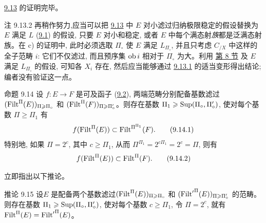 \hyperref[I.prop9.13]{9.13} 的证明完毕。

\begin{enonce*}[remark]{注 9.13.2}
再稍作努力,\pageoriginale 应当可以把 \hyperref[I.prop9.13]{9.13} 中 $E$ 对小滤过归纳极限稳定的假设替换为 $E$ 满足 $L$ (\hyperref[I.def9.1]{9.1}) 的假设, 只要 $E$ 对小和稳定, 或者 $E$ 中每个满态射\emph{族}都是泛满态射族。在 c) 的证明中, 此时必须选取 $\Pi_\circ$ 使 $E$ 满足 $L_{\Pi_\circ}$, 并且只考虑 $C_{/X}$ 中这样的全子范畴 $i$: 它们不仅滤过, 而且预序集 $\operatorname{ob}
i$ 相对于 $\Pi_\circ$ 为大。利用 \hyperref[I.sec8]{第 8 节} 及 $E$ 满足 $L_{\Pi_\circ}$ 的假设, 可知各 $X_i$ 存在, 然后应当能够通过 \hyperref[I.lem9.13.1]{9.13.1} 的适当变形得出结论; 编者没有验证这一点。
\end{enonce*}


\begin{enonce*}{命题 9.14}
设 $f:E\rightarrow F$ 是可及函子 (\hyperref[I.def9.2]{9.2}), 两端范畴分别配备基数滤过 $(\operatorname{Filt}^{\Pi}(E))_{\Pi\geqslant\Pi_\circ}$ 和 $(\operatorname{Filt}^{\Pi}(F))_{\Pi\geqslant\Pi'_\circ}$。则存在基数 $\Pi_1\geqslant\operatorname{Sup}(\Pi_\circ,\Pi'_\circ)$, 使对每个基数 $\Pi\geq\Pi_1$ 有
\hypertarget{sga4.exp.I.equation.9.14.1}{}\begin{equation}
f(\operatorname{Filt}^{\Pi}(E))\subset \operatorname{Filt}^{\Pi^{\Pi_1}}(F){}.\tag{9.14.1}
\end{equation}
特别地, 如果 $\Pi=2^c$, 其中 $c\geq\Pi_1$, 从而 $\Pi^{\Pi_1}=2^{c\Pi_1}=2^c=\Pi$, 则有
\hypertarget{sga4.exp.I.equation.9.14.2}{}\begin{equation}
f(\operatorname{Filt}^{\Pi}(E))\subset \operatorname{Filt}^{\Pi}(F){}.\tag{9.14.2}
\end{equation}
\end{enonce*}

立即指出以下推论。

\begin{enonce*}{推论 9.15}
设\pageoriginale $E$ 是配备两个基数滤过\linebreak $(\operatorname{Filt}^{\Pi}(E))_{\Pi\geqslant\Pi_\circ}$ 和 $({\Filt'}^{\Pi}(E))_{\Pi\geq %
\Pi'_\circ}$ 的范畴。则存在基数 $\Pi_1\geqslant\operatorname{Sup}(\Pi_\circ,\Pi'_\circ)$, 使对每个基数 $c\geq\Pi_1$, 令 $\Pi=2^c$, 就有 $\operatorname{Filt}^{\Pi}(E)={\operatorname{Filt}'}^{\Pi}(E)$。
\end{enonce*}

